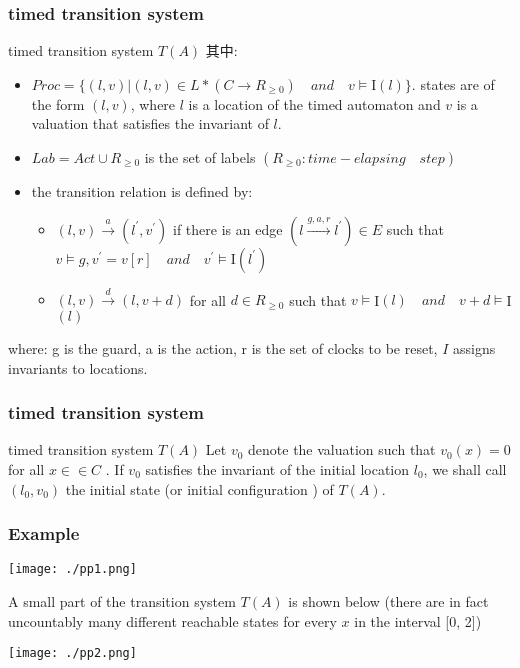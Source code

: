 \documentclass{beamer}
\begin{document}
\begin{frame}
	\frametitle{timed transition system}
	\begin{block}{timed transition system $T(A)$}
		其中:
		\begin{itemize}
			\item $Proc = \{ (l,v)| (l,v) \in L * (C \rightarrow R_{\geq 0}) \quad and \quad v\vDash $I$(l) \}$. states are of the form $(l, v)$, where $l$ is a location of the timed automaton and $v$ is a valuation that satisfies the invariant of $l$.
			\item $Lab = Act \cup R_{\geq 0}$ is the set of labels $(R_{\geq 0}: time - elapsing \quad step)$
			\item the transition relation is defined by:
				\begin{itemize}
					\item $(l,v) \stackrel{a}{\longrightarrow} (l^{'},v^{'})$ if there is an edge $ (l \stackrel{g,a,r}{\longrightarrow} l^{'}) \in E $ such that $v \vDash g , v^{'} = v[r] \quad and \quad v^{'} \vDash $I$(l^{'})$
					\item $(l,v) \stackrel{d}{\longrightarrow} (l,v + d)$ for all $d \in R_{\geq 0}$ such that $ v \vDash $I$(l) \quad and \quad v+d \vDash $I$(l)$
				\end{itemize}
		\end{itemize}
	\end{block}
			where: g is the guard, a is the action, r is the set of clocks to be reset, $I$ assigns invariants to locations.
\end{frame}


\begin{frame}
	\frametitle{timed transition system}
	\begin{block}{timed transition system $T(A)$}
		Let $v_0$ denote the valuation such that $v_0 (x) = 0$ for all $x ∈\in C$ . If $v_0$ satisfies the invariant of the initial location $l_0$, we shall call $(l_0 , v_0 )$ the initial state (or initial configuration ) of $T(A)$.
	\end{block}
\end{frame}


\begin{frame}
	\frametitle{Example}
	\begin{center}
		\texttt{[image: ./pp1.png]}
	\end{center}
	A small part of the transition system $T(A)$ is shown below (there are in fact uncountably many different reachable states for every $x$ in the interval [0, 2])
	\begin{center}
		\texttt{[image: ./pp2.png]}
	\end{center}
\end{frame}
\end{document}
